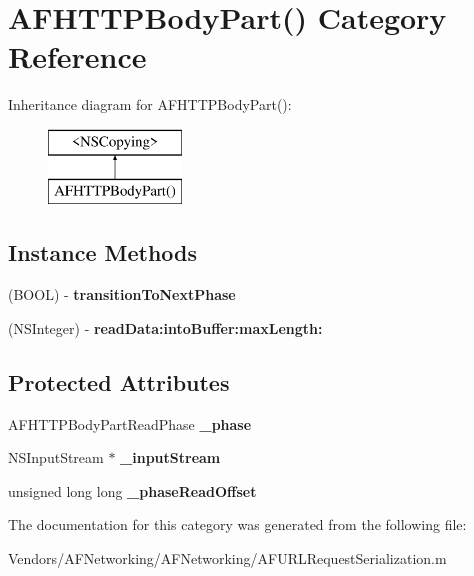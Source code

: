 \hypertarget{category_a_f_h_t_t_p_body_part_07_08}{}\section{A\+F\+H\+T\+T\+P\+Body\+Part() Category Reference}
\label{category_a_f_h_t_t_p_body_part_07_08}
Inheritance diagram for A\+F\+H\+T\+T\+P\+Body\+Part()\+:\begin{figure}[H]
\begin{center}
\leavevmode
\includegraphics[height=2.000000cm]{category_a_f_h_t_t_p_body_part_07_08}
\end{center}
\end{figure}
\subsection*{Instance Methods}
\begin{DoxyCompactItemize}
\item 
\hypertarget{category_a_f_h_t_t_p_body_part_07_08_a7a1d3c4cecb39d49eacd5d93a6ec0e53}{}(B\+O\+O\+L) -\/ {\bfseries transition\+To\+Next\+Phase}\label{category_a_f_h_t_t_p_body_part_07_08_a7a1d3c4cecb39d49eacd5d93a6ec0e53}

\item 
\hypertarget{category_a_f_h_t_t_p_body_part_07_08_a70ad0187fac159bc5a2aabc37bf6da06}{}(N\+S\+Integer) -\/ {\bfseries read\+Data\+:into\+Buffer\+:max\+Length\+:}\label{category_a_f_h_t_t_p_body_part_07_08_a70ad0187fac159bc5a2aabc37bf6da06}

\end{DoxyCompactItemize}
\subsection*{Protected Attributes}
\begin{DoxyCompactItemize}
\item 
\hypertarget{category_a_f_h_t_t_p_body_part_07_08_a9e462f49c6b01eb159ee18e4dfa9f2dc}{}A\+F\+H\+T\+T\+P\+Body\+Part\+Read\+Phase {\bfseries \+\_\+phase}\label{category_a_f_h_t_t_p_body_part_07_08_a9e462f49c6b01eb159ee18e4dfa9f2dc}

\item 
\hypertarget{category_a_f_h_t_t_p_body_part_07_08_a3ff59819a038e5b89a041b6e59b9f858}{}N\+S\+Input\+Stream $\ast$ {\bfseries \+\_\+input\+Stream}\label{category_a_f_h_t_t_p_body_part_07_08_a3ff59819a038e5b89a041b6e59b9f858}

\item 
\hypertarget{category_a_f_h_t_t_p_body_part_07_08_ab23d067a3e044b62a837e737042cd721}{}unsigned long long {\bfseries \+\_\+phase\+Read\+Offset}\label{category_a_f_h_t_t_p_body_part_07_08_ab23d067a3e044b62a837e737042cd721}

\end{DoxyCompactItemize}


The documentation for this category was generated from the following file\+:\begin{DoxyCompactItemize}
\item 
Vendors/\+A\+F\+Networking/\+A\+F\+Networking/A\+F\+U\+R\+L\+Request\+Serialization.\+m\end{DoxyCompactItemize}
